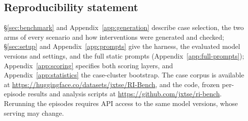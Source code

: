 \documentclass{article}
\begin{document}
\subsection*{Reproducibility statement}
\S\ref{sec:benchmark} and Appendix~\ref{app:generation} describe case
selection, the two arms of every scenario and how interventions were
generated and checked; \S\ref{sec:setup} and
Appendix~\ref{app:prompts} give the harness, the evaluated model
versions and settings, and the full static prompts
(Appendix~\ref{app:full-prompts}); Appendix~\ref{app:scoring} specifies
both scoring layers, and Appendix~\ref{app:statistics} the case-cluster
bootstrap. 
The case corpus is available at
\url{https://huggingface.co/datasets/jxtse/RI-Bench}, and the code,
frozen per-episode results and analysis scripts at
\url{https://github.com/jxtse/ri-bench}. Rerunning the episodes
requires API access to the same model versions, whose serving may
change.




\clearpage
\appendix

\end{document}
